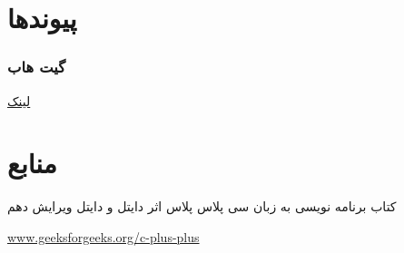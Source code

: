 \documentclass[pdf,titlepage,a4paper]{report}
\begin{document}
	\part{پیوندها}
	\section{گیت هاب}
	\href{https://github.com/Matin0789/Condottiere-.git}{لینک}

	\newpage
	
	
	
	\part{منابع}
	\begin{itemize}
		\item کتاب برنامه نویسی به زبان سی پلاس پلاس اثر دایتل و دایتل ویرایش دهم\\
	\begin{latin}
		\item \href{https://www.geeksforgeeks.org/c-plus-plus/}{www.geeksforgeeks.org/c-plus-plus}
	\end{latin}
	\end{itemize}
	
	
\end{document}
